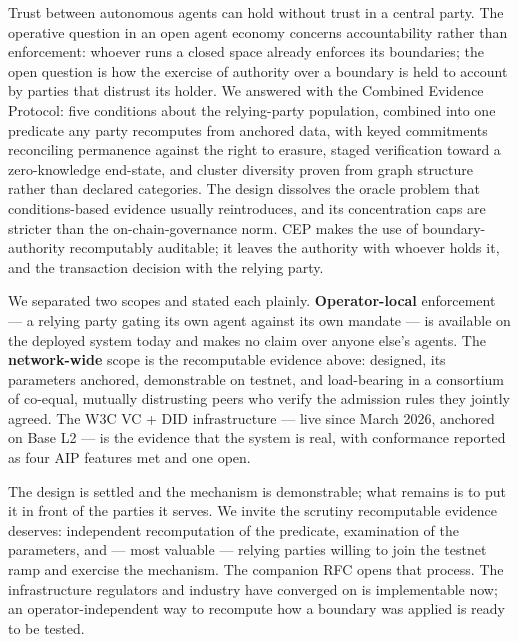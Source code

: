 Trust between autonomous agents can hold without trust in a central party. The operative question in an open agent economy concerns accountability rather than enforcement: whoever runs a closed space already enforces its boundaries; the open question is how the exercise of authority over a boundary is held to account by parties that distrust its holder. We answered with the Combined Evidence Protocol: five conditions about the relying-party population, combined into one predicate any party recomputes from anchored data, with keyed commitments reconciling permanence against the right to erasure, staged verification toward a zero-knowledge end-state, and cluster diversity proven from graph structure rather than declared categories. The design dissolves the oracle problem that conditions-based evidence usually reintroduces, and its concentration caps are stricter than the on-chain-governance norm. CEP makes the use of boundary-authority recomputably auditable; it leaves the authority with whoever holds it, and the transaction decision with the relying party.

We separated two scopes and stated each plainly. \textbf{Operator-local} enforcement — a relying party gating its own agent against its own mandate — is available on the deployed system today and makes no claim over anyone else's agents. The \textbf{network-wide} scope is the recomputable evidence above: designed, its parameters anchored, demonstrable on testnet, and load-bearing in a consortium of co-equal, mutually distrusting peers who verify the admission rules they jointly agreed. The W3C VC + DID infrastructure — live since March 2026, anchored on Base L2 — is the evidence that the system is real, with conformance reported as four AIP features met and one open.

The design is settled and the mechanism is demonstrable; what remains is to put it in front of the parties it serves. We invite the scrutiny recomputable evidence deserves: independent recomputation of the predicate, examination of the parameters, and — most valuable — relying parties willing to join the testnet ramp and exercise the mechanism. The companion RFC opens that process. The infrastructure regulators and industry have converged on is implementable now; an operator-independent way to recompute how a boundary was applied is ready to be tested.
